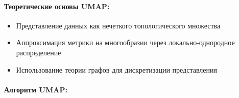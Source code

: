 \documentclass[a4paper,12pt]{article}
\begin{document}
\paragraph{Теоретические основы UMAP:}
\begin{itemize}
    \item Представление данных как нечеткого топологического множества
    \item Аппроксимация метрики на многообразии через локально-однородное распределение
    \item Использование теории графов для дискретизации представления
\end{itemize}

\paragraph{Алгоритм UMAP:}
\end{document}
